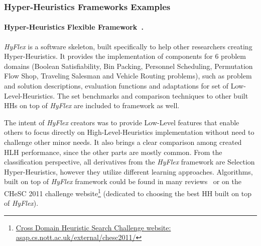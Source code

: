 \subsubsection{Hyper-Heuristics Frameworks Examples}\label{bg: hh fw examples}
\paragraph{Hyper-Heuristics Flexible Framework~\cite{ochoa2012hyflex}.} \textit{HyFlex} is a software skeleton, built specifically to help other researchers creating Hyper-Heuristics. It provides the implementation of components for 6 problem domains (Boolean Satisfiability, Bin Packing, Personnel Scheduling, Permutation Flow Shop, Traveling Salesman and Vehicle Routing problems), such as problem and solution descriptions, evaluation functions and adaptations for set of Low-Level-Heuristics. The set benchmarks and comparison techniques to other built HHs on top of \textit{HyFlex} are included to framework as well. 

The intent of \textit{HyFlex} creators was to provide Low-Level features that enable others to focus directly on High-Level-Heuristics implementation without need to challenge other minor needs. It also brings a clear comparison among created HLH performance, since the other parts are mostly common. From the classification perspective, all derivatives from the \textit{HyFlex} framework are Selection Hyper-Heuristics, however they utilize different learning approaches. Algorithms, built on top of \textit{HyFlex} framework could be found in many reviews~\cite{misir2012intelligent,ryser2014review,drake2019recent} or on the CHeSC 2011 challenge website\footnote[1]{\href{http://www.asap.cs.nott.ac.uk/external/chesc2011/}{Cross Domain Heuristic Search Challenge website: asap.cs.nott.ac.uk/external/chesc2011/}} (dedicated to choosing the best HH built on top of \textit{HyFlex}).

